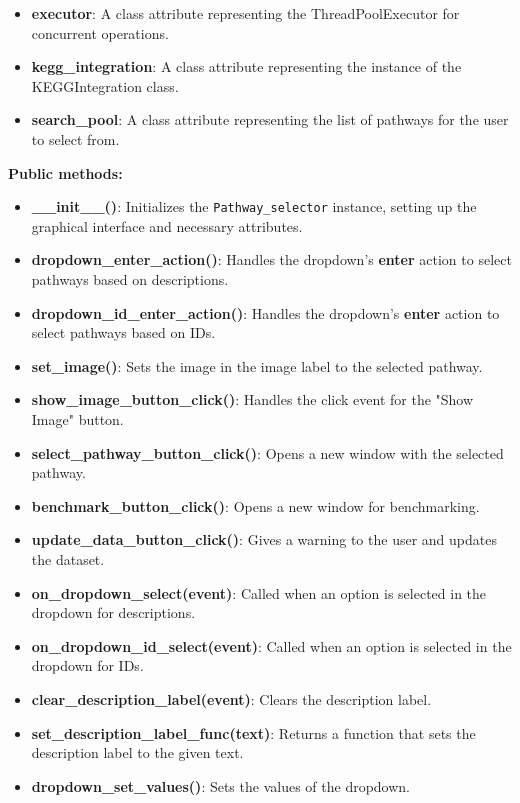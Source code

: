 \begin{itemize}
    \item \textbf{executor}: A class attribute representing the ThreadPoolExecutor for concurrent operations.
    \item \textbf{kegg\_integration}: A class attribute representing the instance of the KEGGIntegration class.
    \item \textbf{search\_pool}: A class attribute representing the list of pathways for the user to select from.
\end{itemize}

\textbf{Public methods:}

\begin{itemize}
    \item \textbf{\_\_init\_\_()}: Initializes the \texttt{Pathway\_selector} instance, setting up the graphical interface and necessary attributes.
    \item \textbf{dropdown\_enter\_action()}: Handles the dropdown's \textbf{enter} action to select pathways based on descriptions.
    \item \textbf{dropdown\_id\_enter\_action()}: Handles the dropdown's \textbf{enter} action to select pathways based on IDs.
    \item \textbf{set\_image()}: Sets the image in the image label to the selected pathway.
    \item \textbf{show\_image\_button\_click()}: Handles the click event for the "Show Image" button.
    \item \textbf{select\_pathway\_button\_click()}: Opens a new window with the selected pathway.
    \item \textbf{benchmark\_button\_click()}: Opens a new window for benchmarking.
    \item \textbf{update\_data\_button\_click()}: Gives a warning to the user and updates the dataset.
    \item \textbf{on\_dropdown\_select(event)}: Called when an option is selected in the dropdown for descriptions.
    \item \textbf{on\_dropdown\_id\_select(event)}: Called when an option is selected in the dropdown for IDs.
    \item \textbf{clear\_description\_label(event)}: Clears the description label.
    \item \textbf{set\_description\_label\_func(text)}: Returns a function that sets the description label to the given text.
    \item \textbf{dropdown\_set\_values()}: Sets the values of the dropdown.
\end{itemize}

